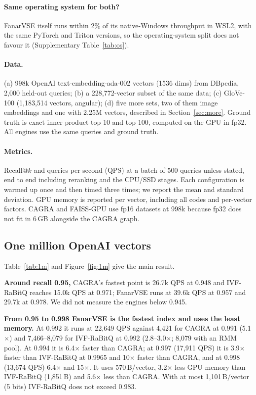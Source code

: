 \documentclass[fleqn,10pt]{wlscirep}
\begin{document}
\paragraph{Same operating system for both?} FanarVSE itself runs within 2\% of its native-Windows throughput in WSL2, with the same PyTorch and Triton versions, so the operating-system split does not favour it (Supplementary Table~\ref{tab:os}).

\paragraph{Data.} (a) 998k OpenAI text-embedding-ada-002 vectors (1536 dims) from DBpedia, 2{,}000 held-out queries; (b) a 228{,}772-vector subset of the same data; (c) GloVe-100 (1{,}183{,}514 vectors, angular); (d) five more sets, two of them image embeddings and one with 2.25M vectors, described in Section~\ref{sec:more}. Ground truth is exact inner-product top-10 and top-100, computed on the GPU in fp32. All engines use the same queries and ground truth.

\paragraph{Metrics.} Recall@$k$ and queries per second (QPS) at a batch of 500 queries unless stated, end to end including reranking and the CPU/SSD stages. Each configuration is warmed up once and then timed three times; we report the mean and standard deviation. GPU memory is reported per vector, including all codes and per-vector factors. CAGRA and FAISS-GPU use fp16 datasets at 998k because fp32 does not fit in 6\,GB alongside the CAGRA graph.

\subsection{One million OpenAI vectors}
Table~\ref{tab:1m} and Figure~\ref{fig:1m} give the main result.

\textbf{Around recall 0.95,} CAGRA's fastest point is 26.7k QPS at 0.948 and IVF-RaBitQ reaches 15.0k QPS at 0.971; FanarVSE runs at 39.6k QPS at 0.957 and 29.7k at 0.978. We did not measure the engines below 0.945.

\textbf{From 0.95 to 0.998 FanarVSE is the fastest index and uses the least memory.} At 0.992 it runs at 22{,}649 QPS against 4{,}421 for CAGRA at 0.991 (5.1$\times$) and 7{,}466--8{,}079 for IVF-RaBitQ at 0.992 (2.8--3.0$\times$; 8{,}079 with an RMM pool). At 0.994 it is 6.4$\times$ faster than CAGRA; at 0.997 (17{,}911 QPS) it is 3.9$\times$ faster than IVF-RaBitQ at 0.9965 and 10$\times$ faster than CAGRA, and at 0.998 (13{,}674 QPS) 6.4$\times$ and 15$\times$. It uses 570\,B/vector, 3.2$\times$ less GPU memory than IVF-RaBitQ (1{,}851\,B) and 5.6$\times$ less than CAGRA. With at most 1{,}101\,B/vector (5 bits) IVF-RaBitQ does not exceed 0.983.
\end{document}
